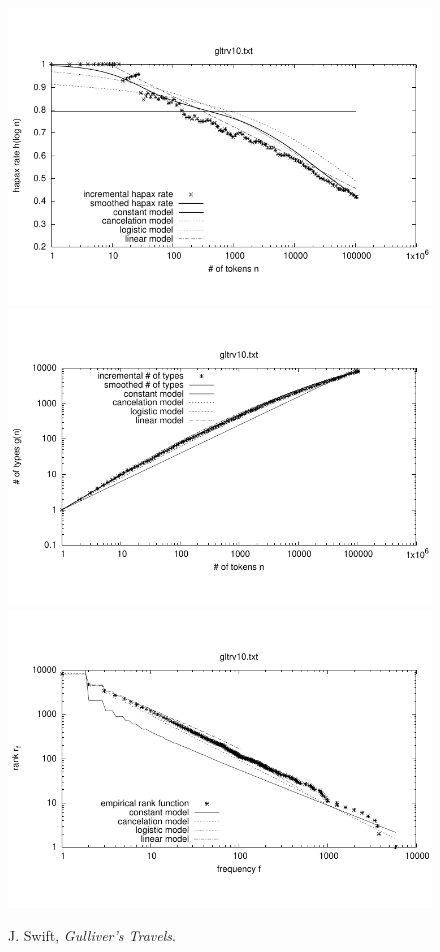 \documentclass[a4paper,12pt]{article}
\begin{document}

\begin{figure}[p]
  \centering
  \vspace{-2em}
  \includegraphics[width=0.8\columnwidth]{output/herdan/gltrv10_27/token_ratio.pdf}
  \\[-3em]
  \includegraphics[width=0.8\columnwidth]{output/herdan/gltrv10_27/token_type.pdf}
  \\[-3em]
  \includegraphics[width=0.8\columnwidth]{output/herdan/gltrv10_27/frequency_rank.pdf}
  \vspace{-2em}
  \caption{J. Swift, \emph{Gulliver’s Travels}.\label{figgltrv10F}}
\end{figure}
\end{document}
